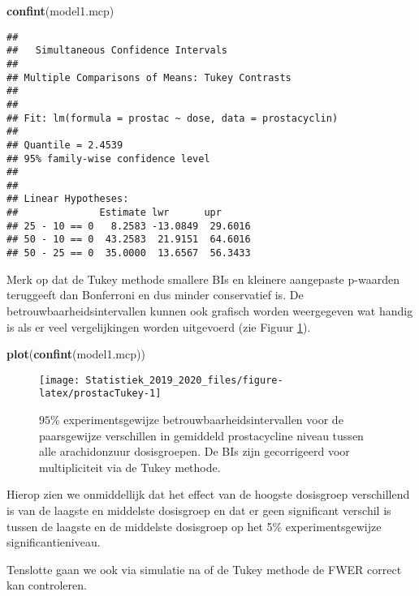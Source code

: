 \documentclass[12pt,dutch,coursenotes]{book}
\newenvironment{Shaded}{\begin{snugshade}}{\end{snugshade}}
\newcommand{\KeywordTok}[1]{\textcolor[rgb]{0.13,0.29,0.53}{\textbf{#1}}}
\newcommand{\NormalTok}[1]{#1}
\theoremstyle{definition}
\theoremstyle{definition}
\theoremstyle{definition}
\theoremstyle{remark}
\begin{document}
\begin{Shaded}
\begin{Highlighting}[]
\KeywordTok{confint}\NormalTok{(model1.mcp)}
\end{Highlighting}
\end{Shaded}

\begin{verbatim}
## 
##   Simultaneous Confidence Intervals
## 
## Multiple Comparisons of Means: Tukey Contrasts
## 
## 
## Fit: lm(formula = prostac ~ dose, data = prostacyclin)
## 
## Quantile = 2.4539
## 95% family-wise confidence level
##  
## 
## Linear Hypotheses:
##              Estimate lwr      upr     
## 25 - 10 == 0   8.2583 -13.0849  29.6016
## 50 - 10 == 0  43.2583  21.9151  64.6016
## 50 - 25 == 0  35.0000  13.6567  56.3433
\end{verbatim}

Merk op dat de Tukey methode smallere BIs en kleinere aangepaste
p-waarden teruggeeft dan Bonferroni en dus minder conservatief is. De
betrouwbaarheidsintervallen kunnen ook grafisch worden weergegeven wat
handig is als er veel vergelijkingen worden uitgevoerd (zie Figuur
\ref{fig:prostacTukey}).

\begin{Shaded}
\begin{Highlighting}[]
\KeywordTok{plot}\NormalTok{(}\KeywordTok{confint}\NormalTok{(model1.mcp))}
\end{Highlighting}
\end{Shaded}

\begin{figure}

{\centering \texttt{[image: Statistiek\_2019\_2020\_files/figure-latex/prostacTukey-1]} 

}

\caption{$95\%$ experimentsgewijze betrouwbaarheidsintervallen voor de paarsgewijze verschillen in gemiddeld prostacycline niveau tussen alle arachidonzuur dosisgroepen. De BIs zijn gecorrigeerd voor multipliciteit via de Tukey methode.}\label{fig:prostacTukey}
\end{figure}

Hierop zien we onmiddellijk dat het effect van de hoogste dosisgroep
verschillend is van de laagste en middelste dosisgroep en dat er geen
significant verschil is tussen de laagste en de middelste dosisgroep op
het 5\% experimentsgewijze significantieniveau.

Tenslotte gaan we ook via simulatie na of de Tukey methode de FWER
correct kan controleren.
\end{document}
